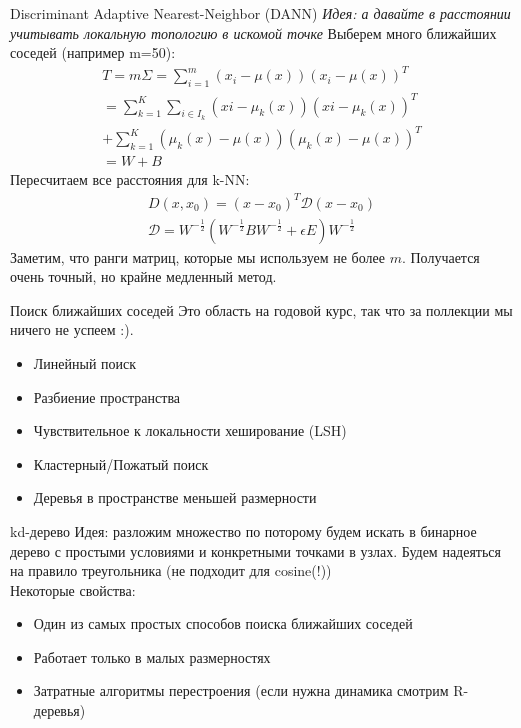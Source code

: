 \documentclass[14pt, fleqn, xcolor={dvipsnames, table}]{beamer}
\begin{document}
\begin{frame}{Discriminant Adaptive Nearest-Neighbor (DANN)}
\small
\emph{Идея: а давайте в расстоянии учитывать локальную топологию в искомой точке}
Выберем много ближайших соседей (например m=50): \\
$$
  \begin{array}{l}
    T = m\Sigma = \sum_{i=1}^m(x_i - \mu(x))(x_i - \mu(x))^T \\
    = \sum_{k=1}^K \sum_{i \in I_k} (xi - \mu_k(x))(xi - \mu_k(x))^T \\
    + \sum_{k=1}^K(\mu_k(x) - \mu(x))(\mu_k(x) - \mu(x))^T \\ 
    = W + B
  \end{array}
$$
Пересчитаем все расстояния для k-NN:
$$
  \begin{array}{l}
    D(x, x_0) = (x - x_0)^T \mathcal{D}(x - x_0) \\
    \mathcal{D}=W^{-\frac{1}{2}} (W^{-\frac{1}{2}} B W^{-\frac{1}{2}} + \epsilon E) W^{-\frac{1}{2}}
  \end{array}
$$
Заметим, что ранги матриц, которые мы используем не более $m$. Получается очень точный, но крайне медленный метод.
\end{frame}

\begin{frame}{Поиск ближайших соседей}
  Это область на годовой курс, так что за поллекции мы ничего не успеем :).
  \begin{itemize}
    \item Линейный поиск
    \item Разбиение пространства
    \item Чувствительное к локальности хеширование (LSH)
    \item Кластерный/Пожатый поиск
    \item Деревья в пространстве меньшей размерности
  \end{itemize}
\end{frame}

\begin{frame}{kd-дерево}
  Идея: разложим множество по поторому будем искать в бинарное дерево с простыми условиями и конкретными точками в узлах. Будем надеяться на правило треугольника (не подходит для cosine(!)) \\
  Некоторые свойства:
  \begin{itemize}
    \item Один из самых простых способов поиска ближайших соседей
    \item Работает только в малых размерностях
    \item Затратные алгоритмы перестроения (если нужна динамика смотрим R-деревья)
  \end{itemize}  
\end{frame}
\end{document}
